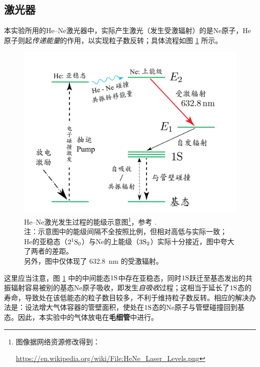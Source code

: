 \documentclass{buaaemp}
\begin{document}
\subsection{激光器}
	本实验所用的He--Ne激光器中，实际产生激光（发生受激辐射）的是Ne原子，He原子则起\textit{传递能量}的作用，以实现粒子数反转；具体流程如图 \ref{fig:HeNeLevel} 所示。
	\begin{figure}[!h]
	\centering
	\vspace{-1.2\baselineskip}
	\includegraphics[width=.8\linewidth]{image/HeNeLaserLevel.png}
	\caption[\textup{He--Ne}激光原理]{%
		\textup{He--Ne}激光发生过程的能级示意图\footnote{%
			图像据网络资源修改得到：\par
			\noindent%
			\url{https://en.wikipedia.org/wiki/File:HeNe_Laser_Levels.png}%
		}，参考 \cite{javan1961population}. \\[1ex]
		注：示意图中的能级间隔不全按照比例，但相对高低与实际一致；\\
		\textup{He}的亚稳态（$2^1\rm{S}_0$）与\textup{Ne}的上能级（$3\rm{S}_2$）实际十分接近，图中夸大了两者的差距。\\
		另外，图中仅体现了 \SI{632.8}{\nm} 的受激辐射。
		\vspace{1ex}
	}
	\label{fig:HeNeLevel}
	\end{figure}
	
	这里应当注意，图 \ref{fig:HeNeLevel} 中的中间能态$1\rm{S}$中存在亚稳态，同时$1\rm{S}$跃迁至基态发出的共振辐射容易被别的基态Ne原子吸收，即发生\textit{自吸收}过程\cite{javan1961population}；这相当于延长了$1\rm{S}$态的寿命，导致处在该低能态的粒子数目较多，不利于维持粒子数反转。相应的解决办法是：设法增大气体容器的管壁面积，使处在$1\rm{S}$态的Ne原子与管壁碰撞回到基态。因此，本实验中的气体放电在\textbf{毛细管}中进行。
	
\end{document}
